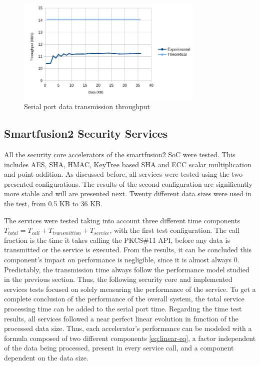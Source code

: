 \begin{figure}[h!]
	\centering
	\includegraphics[width=0.8\textwidth]{./Images/comms-tput.png}
	\caption{Serial port data transmission throughput}
	\label{fig:comms:tput}
\end{figure}

\subsection{Smartfusion2 Security Services}\label{chap:evaluation:board}

All the security core accelerators of the smartfusion2 SoC were tested. This includes \ac{AES}, \ac{SHA}, \ac{HMAC}, KeyTree based \ac{SHA} and \ac{ECC} scalar multiplication and point addition.
As discussed before, all services were tested using the two presented configurations. The results of the second configuration are significantly more stable and will are presented next.
Twenty different data sizes were used in the test, from 0.5 KB to 36 KB.

The services were tested taking into account three different time components \(T_{total} = T_{call} + T_{transmittion} + T_{service}\), with the first test configuration. The call fraction is the time it takes calling the PKCS\#11 API, before any data is transmitted or the service is executed. From the results, it can be concluded this component's impact on performance is negligible, since it is almost always 0.
Predictably, the transmission time always follow the performance model studied in the previous section.
Thus, the following security core and implemented services tests focused on solely measuring the performance of the service. To get a complete conclusion of the performance of the overall system, the total service processing time can be added to the serial port time.
Regarding the time test results, all services followed a near perfect linear evolution in function of the processed data size. Thus, each accelerator's performance can be modeled with a formula composed of two different components \ref{eq:linear-eq}, a factor independent of the data being processed, present in every service call, and a component dependent on the data size.

